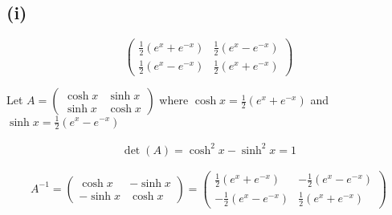 \subsection*{(i)}
\[
	\begin{pmatrix}
		\frac{1}{2}(e^x + e^{-x}) & \frac{1}{2}(e^x - e^{-x}) \\
		\frac{1}{2}(e^x - e^{-x}) & \frac{1}{2}(e^x + e^{-x})
	\end{pmatrix}
\]

Let $A = \begin{pmatrix}
		\cosh x & \sinh x \\
		\sinh x & \cosh x
	\end{pmatrix}$ where $\cosh x = \frac{1}{2}(e^x + e^{-x})$ and $\sinh x = \frac{1}{2}(e^x - e^{-x})$

\begin{align}
	\det(A) = \cosh^2 x - \sinh^2 x = 1
\end{align}

\[
	A^{-1} = \begin{pmatrix}
		\cosh x  & -\sinh x \\
		-\sinh x & \cosh x
	\end{pmatrix} = \begin{pmatrix}
		\frac{1}{2}(e^x + e^{-x})  & -\frac{1}{2}(e^x - e^{-x}) \\
		-\frac{1}{2}(e^x - e^{-x}) & \frac{1}{2}(e^x + e^{-x})
	\end{pmatrix}
\]